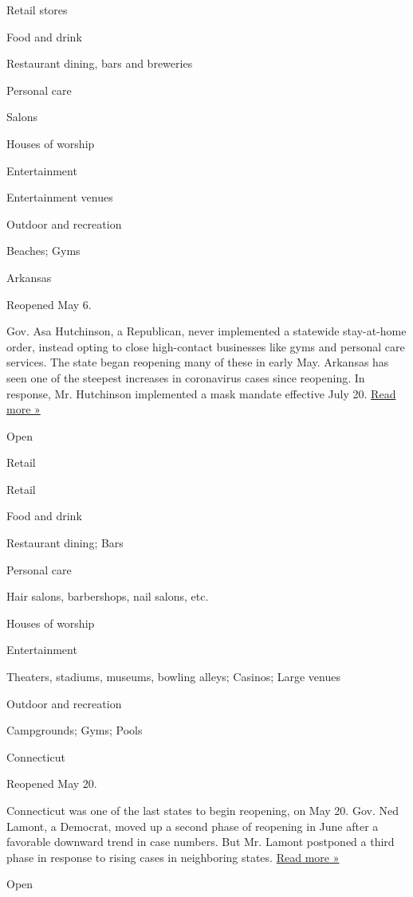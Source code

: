 Retail stores

Food and drink

Restaurant dining, bars and breweries

Personal care

Salons

Houses of worship

Entertainment

Entertainment venues

Outdoor and recreation

Beaches; Gyms

Arkansas

Reopened May 6.

Gov. Asa Hutchinson, a Republican, never implemented a statewide
stay-at-home order, instead opting to close high-contact businesses like
gyms and personal care services. The state began reopening many of these
in early May. Arkansas has seen one of the steepest increases in
coronavirus cases since reopening. In response, Mr. Hutchinson
implemented a mask mandate effective July 20.
\href{https://www.kspr.com/content/news/Arkansas-governor-No-further-reopening-as-virus-cases-surge-571501921.html}{Read
more »}

Open

Retail

Retail

Food and drink

Restaurant dining; Bars

Personal care

Hair salons, barbershops, nail salons, etc.

Houses of worship

Entertainment

Theaters, stadiums, museums, bowling alleys; Casinos; Large venues

Outdoor and recreation

Campgrounds; Gyms; Pools

Connecticut

Reopened May 20.

Connecticut was one of the last states to begin reopening, on May 20.
Gov. Ned Lamont, a Democrat, moved up a second phase of reopening in
June after a favorable downward trend in case numbers. But Mr. Lamont
postponed a third phase in response to rising cases in neighboring
states.
\href{https://www.courant.com/coronavirus/hc-news-coronavirus-clb-reopening-paused-20200707-lnivp6hb4redtphmjj7yif3kci-story.html}{Read
more »}

Open

